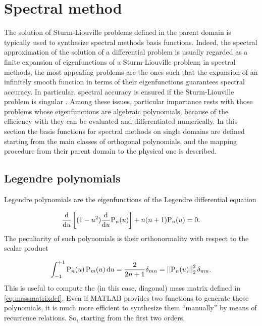 \documentclass[a4paper,12pt]{article}
\begin{document}



\section{Spectral method}

The solution of Sturm-Liouville problems defined in the parent domain is typically used to synthesize spectral methods basis functions. Indeed, the spectral approximation of the solution of a differential problem is usually regarded as a finite expansion of eigenfunctions of a Sturm-Liouville problem; in spectral methods, the most appealing problems are the ones such that the expansion of an infinitely smooth function in terms of their eigenfunctions guarantees spectral accuracy. In particular, spectral accuracy is ensured if the Sturm-Liouville problem is singular \cite{canuto1}. Among these issues, particular importance rests with those problems whose eigenfunctions are algebraic polynomials, because of the efficiency with they can be evaluated and differentiated numerically. In this section the basis functions for spectral methods on single domains are defined starting from the main classes of orthogonal polynomials, and the mapping procedure from their parent domain to the physical one is described.

\subsection{Legendre polynomials}

Legendre polynomials are the eigenfunctions of the Legendre differential equation

\begin{equation}
\frac{\mathrm{d}}{\mathrm{d} u} \left[ (1-u^2) \frac{\mathrm{d}}{\mathrm{d} u} \mathrm{P}_n(u) \right] + n(n+1) \mathrm{P}_n(u) = 0.
\label{eq:legendrediff}
\end{equation}
The peculiarity of such polynomials is their orthonormality with respect to the scalar product

\begin{equation}
\int_{-1}^{+1} \mathrm{P}_n(u) \, \mathrm{P}_m(u) \, \mathrm{d} u = \frac{2}{2n+1} \delta_{mn} = \left| \left| \mathrm{P}_n(u) \right| \right|_2^2 \delta_{mn}.
\label{eq:legendrenorm}
\end{equation}
This is useful to compute the (in this case, diagonal) mass matrix defined in \eqref{eq:massmatrixdef}. Even if MATLAB provides two functions to generate those polynomials, it is much more efficient to synthesize them ``manually'' by means of recurrence relations. So, starting from the first two orders,
\end{document}
